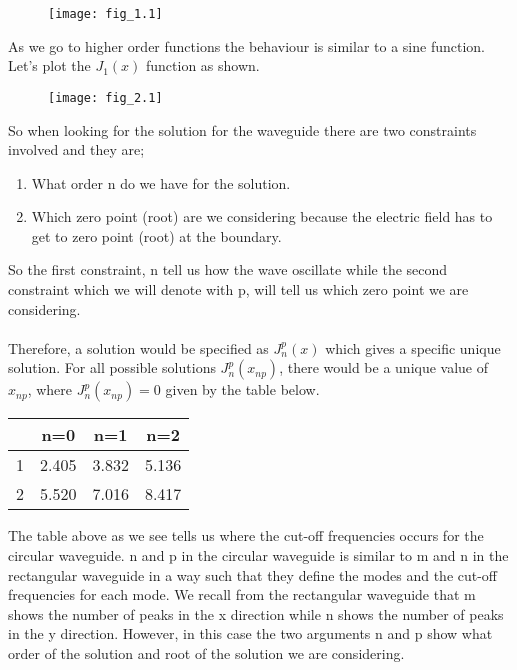 	 \begin{figure}[H]
	 	\centering
	 	\texttt{[image: fig\_1.1]}
	 	\caption{}
	 	\label{fig:fig1}
	 \end{figure}
	 
	 
	 As we go to higher order functions the behaviour is similar to a sine function. Let's plot the $J_1(x)$ function as shown.
	 
	 \begin{figure}[H]
	 	\centering
	 	\texttt{[image: fig\_2.1]}
	 	\caption{}
	 	\label{fig:fig2}
	 \end{figure}
	 
	 So when looking for the solution for the waveguide there are two constraints involved and they are;
	 \begin{enumerate}
	 	\item What order n do we have for the solution.
	 	\item Which zero point (root) are we considering because the electric field has to get to zero point (root) at the boundary.
	 \end{enumerate}
	 So the first constraint, n tell us how the wave oscillate while the second constraint which we will denote with p, will tell us which zero point we are considering. 
	 \paragraph{} Therefore, a solution would be specified as $J_n^p(x)$ which gives a specific unique solution. For all possible solutions $J_n^p(x_{np})$, there would be a unique value of $x_{np}$, where $J_n^p(x_{np})=0$ given by the table below.
	 \begin{center}
	 	\begin{tabular}{|c|c c c|}
	 		\hline 
	 		\backslashbox{p}{n} & n=0 & n=1 & n=2 \\ 
	 		\hline 
	 		1&  2.405&  3.832& 5.136 \\ 
	 		
	 		2&  5.520&  7.016& 8.417 \\ 
	 		\hline 
	 	\end{tabular} 
	 \end{center}
	  The table above as we see tells us where the cut-off frequencies occurs for the circular waveguide. n and p in the circular waveguide is similar to m and n in the rectangular waveguide in a way such that they define the modes and the cut-off frequencies for each mode. We recall from the rectangular waveguide that m shows the number of peaks in the x direction while n shows the number of peaks in the y direction. However, in this case the two arguments n and p show what order of the solution and root of the solution we are considering.\\
	 
